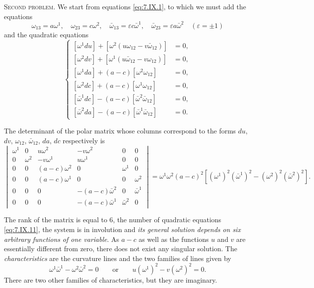 \documentclass[leqno,11pt]{book}
\numberwithin{equation}{chapter}
\theoremstyle{shape1}
\theoremstyle{shape0}
\theoremstyle{shape2}
\theoremstyle{definition}
\begin{document}
\vspace{12pt}\fsec\textsc{Second problem}. We start from equations \eqref{eq:7.IX.1}, to which we must add the equations
\begin{equation}
  \label{eq:7.IX.10}\tag{IX, 10}
  \omega_{13}=a\omega^{1},\quad\omega_{23}=c\omega^{2},\quad\bar\omega_{13}=\varepsilon c\bar\omega^{1},\quad\bar\omega_{23}=\varepsilon a\bar\omega^{2}\quad(\varepsilon=\pm 1)
\end{equation}
and the quadratic equations
\begin{equation}
  \label{eq:7.IX.11}\tag{IX, 11}
  \left\{
    \begin{aligned}{}
      [\omega^{1}du]+[\omega^{2}(u\omega_{12}-v\bar\omega_{12})]&=0,\\
      [\omega^{2}dv]+[\omega^{1}(u\bar\omega_{12}-v\omega_{12})]&=0,\\
      [\omega^{1}da]+(a-c)[\omega^{2}\omega_{12}]&=0,\\
      [\omega^{2}dc]+(a-c)[\omega^{1}\omega_{12}]&=0,\\
      [\bar\omega^{1}dc]-(a-c)[\bar\omega^{2}\bar\omega_{12}]&=0,\\
      [\bar\omega^{2}da]-(a-c)[\bar\omega^{1}\bar\omega_{12}]&=0.
    \end{aligned}
  \right.
\end{equation}

The determinant of the polar matrix whose columns correspond to the forms $du$, $dv$, $\omega_{12}$, $\bar\omega_{12}$, $da$, $dc$ respectively is
\[
\begin{vmatrix}
  \omega^{1}&0&u\omega^{2}&-v\omega^{2}&0&0\\
  0&\omega^{2}&-v\omega^{1}&u\omega^{1}&0&0\\
  0&0&(a-c)\omega^{2}&0&\omega^{1}&0\\
  0&0&(a-c)\omega^{1}&0&0&\omega^{2}\\
  0&0&0&-(a-c)\bar\omega^{2}&0&\bar\omega^{1}\\
  0&0&0&-(a-c)\bar\omega^{1}&\bar\omega^{2}&0
\end{vmatrix}
=\omega^{1}\omega^{2}(a-c)^{2}[(\omega^{1})^{2}(\bar\omega^{1})^{2}-(\omega^{2})^{2}(\bar\omega^{2})^{2}].
\]

The rank of the matrix is equal to $6$, the number of quadratic equations \eqref{eq:7.IX.11}, the system is in involution and \emph{its general solution depends on six arbitrary functions of one variable}. As $a-c$ as well as the functions $u$ and $v$ are essentially different from zero, there does not exist any singular solution. The \emph{characteristics} are the curvature lines and the two families of lines given by
\[
\omega^{1}\bar\omega^{1}-\omega^{2}\bar\omega^{2}=0\qquad\text{or}\qquad u(\omega^{1})^{2}-v(\omega^{2})^{2}=0.
\]
There are two other families of characteristics, but they are imaginary.
\end{document}

